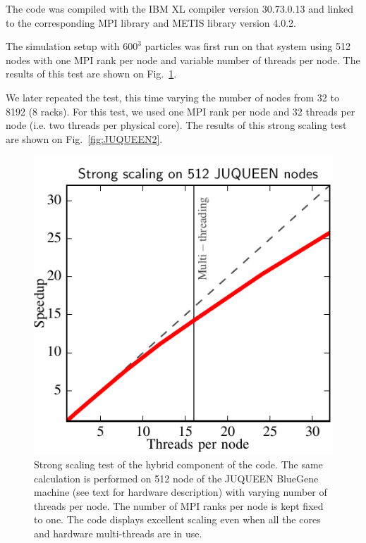 \documentclass{sig-alternate-05-2015}
\begin{document}
The code was compiled with the IBM XL compiler version \textsc{30.73.0.13} and
linked to the corresponding MPI library and METIS library
version \textsc{4.0.2}.

The simulation setup with $600^3$ particles was first run on that system using
512 nodes with one MPI rank per node and variable number of threads per
node. The results of this test are shown on Fig.~\ref{fig:JUQUEEN1}.

We later repeated the test, this time varying the number of nodes from 32 to
8192 (8 racks).  For this test, we used one MPI rank per node and 32 threads per
node (i.e. two threads per physical core). The results of this strong scaling
test are shown on Fig.~\ref{fig:JUQUEEN2}.


\begin{figure}
\centering
\includegraphics[width=\columnwidth]{Figures/scalingInNode}
\caption{Strong scaling test of the hybrid component of the code. The
  same calculation is performed on 512 node of the JUQUEEN BlueGene
  machine (see text for hardware description) with varying number of
  threads per node. The number of MPI ranks per node is kept fixed to
  one. The code displays excellent scaling even when all the cores and
  hardware multi-threads are in use. \label{fig:JUQUEEN1}}
\end{figure}  
\end{document}
